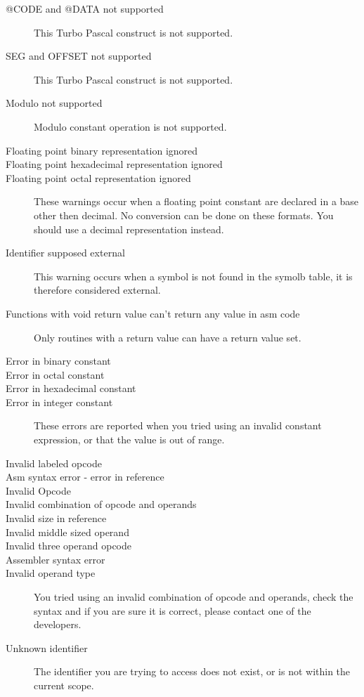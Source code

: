 \begin{description}
\item [@CODE and @DATA not supported]
This Turbo Pascal construct is not supported.
\item [SEG and OFFSET not supported]
This Turbo Pascal construct is not supported.
\item [Modulo not supported]
Modulo constant operation is not supported.
\item [Floating point binary representation ignored]
\item [Floating point hexadecimal representation ignored]
\item [Floating point octal representation ignored]
These warnings occur when a floating point constant are declared in
a base other then decimal. No conversion can be done on these formats.
You should use a decimal representation instead.
\item [Identifier supposed external]
This warning occurs when a symbol is not found in the symolb table, it
is therefore considered external.
\item [Functions with void return value can't return any value in asm code]
Only routines with a return value can have a return value set.

\item [Error in binary constant]
\item [Error in octal constant]
\item [Error in hexadecimal constant]
\item [Error in integer constant]
\label{ErrorConst}
These errors are reported when you tried using an invalid constant expression,
or that the value is out of range.

\item [Invalid labeled opcode]
\item [Asm syntax error - error in reference]
\item [Invalid Opcode]
\item [Invalid combination of opcode and operands]
\item [Invalid size in reference]
\item [Invalid middle sized operand]
\item [Invalid three operand opcode]
\item [Assembler syntax error]
\item [Invalid operand type]
You tried using an invalid combination of opcode and operands, check the syntax
and if you are sure it is correct, please contact one of the developers.

\item [Unknown identifier]
The identifier you are trying to access does not exist, or is not within the
current scope.


\end{description}
